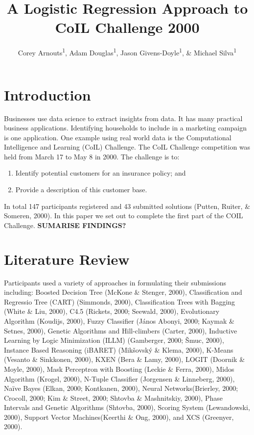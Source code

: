 \documentclass[man]{apa6}
\title{A Logistic Regression Approach to CoIL Challenge 2000}
\author{Corey Arnouts\textsuperscript{1}, Adam Douglas\textsuperscript{1}, Jason Givens-Doyle\textsuperscript{1}, \& Michael Silva\textsuperscript{1}}
\date{}
\affiliation{
\vspace{0.5cm}
\textsuperscript{1} MS in Data Science Students CUNY School of Professional Studies}
\begin{document}
\maketitle

\hypertarget{introduction}{%
\section{Introduction}\label{introduction}}

Businesses use data science to extract insights from data. It has many practical business applications. Identifying households to include in a marketing campaign is one application. One example using real world data is the Computational Intelligence and Learning (CoIL) Challenge. The CoIL Challenge competition was held from March 17 to May 8 in 2000. The challenge is to:

\begin{enumerate}
\def\labelenumi{\arabic{enumi}.}
\item
  Identify potential customers for an insurance policy; and
\item
  Provide a description of this customer base.
\end{enumerate}

In total 147 participants registered and 43 submitted solutions (Putten, Ruiter, \& Someren, 2000). In this paper we set out to complete the first part of the COIL Challenge. \textbf{SUMARISE FINDINGS?}

\hypertarget{literature-review}{%
\section{Literature Review}\label{literature-review}}

Participants used a variety of approaches in formulating their submissions including: Boosted Decision Tree (McKone \& Stenger, 2000), Classification and Regressio Tree (CART) (Simmonds, 2000), Classification Trees with Bagging (White \& Liu, 2000), C4.5 (Rickets, 2000; Seewald, 2000), Evolutionary Algorithm (Koudijs, 2000), Fuzzy Classifier (János Abonyi, 2000; Kaymak \& Setnes, 2000), Genetic Algorithms and Hill-climbers (Carter, 2000), Inductive Learning by Logic Minimization (ILLM) (Gamberger, 2000; Šmuc, 2000), Instance Based Reasoning (iBARET) (Mikšovský \& Klema, 2000), K-Means (Vesanto \& Sinkkonen, 2000), KXEN (Bera \& Lamy, 2000), LOGIT (Doornik \& Moyle, 2000), Mask Perceptron with Boosting (Leckie \& Ferra, 2000), Midos Algorithm (Krogel, 2000), N-Tuple Classifier (Jorgensen \& Linneberg, 2000), Naïve Bayes (Elkan, 2000; Kontkanen, 2000), Neural Networks(Brierley, 2000; Crocoll, 2000; Kim \& Street, 2000; Shtovba \& Mashnitskiy, 2000), Phase Intervals and Genetic Algorithms (Shtovba, 2000), Scoring System (Lewandowski, 2000), Support Vector Machines(Keerthi \& Ong, 2000), and XCS (Greenyer, 2000).
\end{document}
